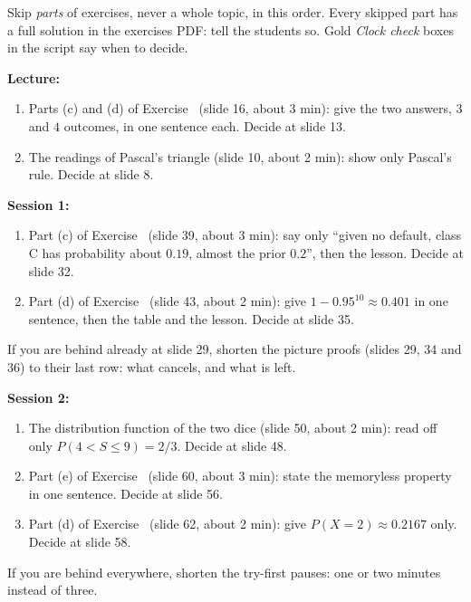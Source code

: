 \documentclass[11pt,a4paper,parskip=half]{scrartcl}
\begin{document}
\begin{printskip}
\begin{cue}
	Skip \emph{parts} of exercises, never a whole topic, in this order. Every
	skipped part has a full solution in the exercises PDF: tell the students
	so. Gold \emph{Clock check} boxes in the script say when to decide.

	\textbf{Lecture:}
	\begin{enumerate}
		\item Parts (c) and (d) of Exercise~ (slide 16,
		      about 3 min): give the two answers, $3$ and $4$ outcomes, in one
		      sentence each. Decide at slide 13.
		\item The readings of Pascal's triangle (slide 10, about 2 min):
		      show only Pascal's rule. Decide at slide 8.
	\end{enumerate}

	\textbf{Session 1:}
	\begin{enumerate}
		\item Part (c) of Exercise~ (slide 39, about
		      3 min): say only ``given no default, class C has probability
		      about $0.19$, almost the prior $0.2$'', then the lesson. Decide
		      at slide 32.
		\item Part (d) of Exercise~ (slide 43, about
		      2 min): give $1-0.95^{10}\approx0.401$ in one sentence, then the
		      table and the lesson. Decide at slide 35.
	\end{enumerate}
	If you are behind already at slide 29, shorten the picture proofs
	(slides 29, 34 and 36) to their last row: what cancels, and what is left.

	\textbf{Session 2:}
	\begin{enumerate}
		\item The distribution function of the two dice (slide 50, about
		      2 min): read off only $P(4<S\le9)=2/3$. Decide at slide 48.
		\item Part (e) of Exercise~ (slide 60, about 3 min):
		      state the memoryless property in one sentence. Decide at
		      slide 56.
		\item Part (d) of Exercise~ (slide 62, about
		      2 min): give $P(X=2)\approx0.2167$ only. Decide at slide 58.
	\end{enumerate}

	If you are behind everywhere, shorten the try-first pauses: one or two
	minutes instead of three.
\end{cue}
\end{printskip}
\end{document}
